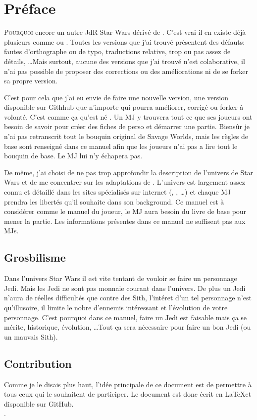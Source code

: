 \onecolumn
\section{Préface}

\lettrine{P}{ourquoi} encore un autre JdR {\jedifont Star Wars} dérivé de . C'est vrai il en existe déjà plusieurs comme  ou . Toutes les versions que j'ai trouvé présentent des défauts: fautes d'orthographe ou de typo, traductions relative, trop ou pas assez de détails, \ldots Mais surtout, aucune des versions que j'ai trouvé n'est colaborative, il n'ai pas possible de proposer des corrections ou des améliorations ni de se forker sa propre version.

C'est pour cela que j'ai eu envie de faire une nouvelle version, une version disponible sur Githhub que n'importe qui pourra améliorer, corrigé ou forker à volonté. C'est comme ça qu'est né {\jedifont \doctitle}. Un MJ y trouvera tout ce que ses joueurs ont besoin de savoir pour créer des fiches de perso et démarrer une partie. Biensûr je n'ai pas retranscrit tout le bouquin original de Savage Worlds, mais les règles de base sont renseigné dans ce manuel afin que les joueurs n'ai pas a lire tout le bouquin de base. Le MJ lui n'y échapera pas.

De même, j'ai choisi de ne pas trop approfondir la description de l'univers de Star Wars et de me concentrer sur les adaptations de . L'univers est largement assez connu et détaillé dans les sites spécialisés sur internet (, , \ldots) et chaque MJ prendra les libertés qu'il souhaite dans son background. Ce manuel est à considérer comme le manuel du joueur, le MJ aura besoin du livre de base  pour mener la partie. Les informations présentes dans ce manuel ne suffisent pas aux MJs.

\subsection{Grosbilisme}
Dans l'univers Star Wars il est vite tentant de vouloir se faire un personnage Jedi. Mais les Jedi ne sont pas monnaie courant dans l'univers. De plus un Jedi n'aura de réelles difficultés que contre des Sith, l'intéret d'un tel personnage n'est qu'illusoire, il limite le nobre d'ennemis intéressant et l'évolution de votre personnage. C'est pourquoi dans ce manuel, faire un Jedi est faisable mais ça se mérite, historique, évolution, \ldots Tout ça sera nécessaire pour faire un bon Jedi (ou un mauvais Sith).

\subsection{Contribution}
Comme je le disais plus haut, l'idée principale de ce document est de permettre à tous ceux qui le souhaitent de participer. Le document est donc écrit en \LaTeX et disponible sur GitHub.\\
\cite{website:jdrp-starwars-reloaded}.

\twocolumn